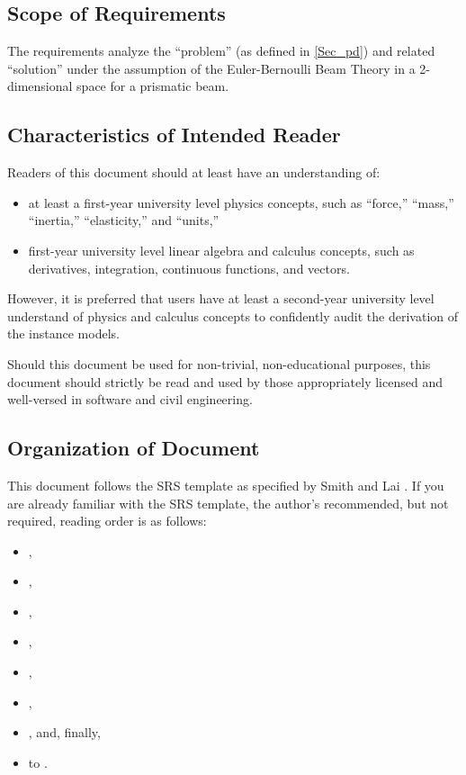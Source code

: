 \documentclass[12pt]{article}
\begin{document}
\subsection{Scope of Requirements} \label{ssec_scope}

The requirements analyze the ``problem'' (as defined in \autoref{Sec_pd}) and
related ``solution'' under the assumption of the Euler-Bernoulli Beam Theory
\cite{EulerBernoulliWiki} in a 2-dimensional space for a prismatic beam.

\subsection{Characteristics of Intended Reader}
\label{sec_IntendedReader}

Readers of this document should at least have an understanding of:
\begin{itemize}
    \item at least a first-year university level physics concepts, such as
          ``force,'' ``mass,'' ``inertia,'' ``elasticity,'' and ``units,''
    \item first-year university level linear algebra and calculus concepts, such
          as derivatives, integration, continuous functions, and vectors.
\end{itemize}

However, it is preferred that users have at least a second-year university level
understand of physics and calculus concepts to confidently audit the derivation
of the instance models.

Should this document be used for non-trivial, non-educational purposes, this
document should strictly be read and used by those appropriately licensed and
well-versed in software and civil engineering.

\subsection{Organization of Document}

This document follows the SRS template as specified by Smith and Lai
\cite{SmithAndLai2005}. If you are already familiar with the SRS template, the
author's recommended, but not required, reading order is as follows:

\begin{itemize}
    \item {},
    \item {},
    \item {},
    \item {},
    \item {},
    \item {},
    \item {}, and, finally,
    \item {} to .
\end{itemize}
\end{document}
